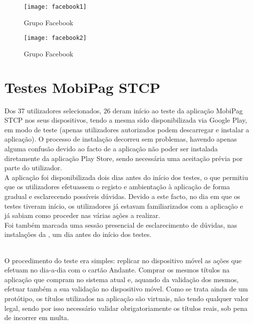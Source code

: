 \begin{figure}[t]
  \begin{center}
    \leavevmode
    \texttt{[image: facebook1]}
    \caption{Grupo Facebook}
    \label{facebook1}
  \end{center}
\end{figure}

\begin{figure}[t]
  \begin{center}
    \leavevmode
    \texttt{[image: facebook2]}
    \caption{Grupo Facebook}
    \label{facebook2}
  \end{center}
\end{figure}

\section{Testes MobiPag STCP}

Dos 37 utilizadores selecionados, 26 deram início ao teste da aplicação MobiPag STCP nos seus dispositivos, tendo a mesma sido disponibilizada via Google Play, em modo de teste (apenas utilizadores autorizados podem descarregar e instalar a aplicação). O processo de instalação decorreu sem problemas, havendo apenas alguma confusão devido ao facto de a aplicação não poder ser instalada diretamente da aplicação Play Store, sendo necessária uma aceitação prévia por parte do utilizador.
\\A aplicação foi disponibilizada dois dias antes do início dos testes, o que permitiu que os utilizadores efetuassem o registo e ambientação à aplicação de forma gradual e esclarecendo possíveis dúvidas. Devido a este facto, no dia em que os testes tiveram início, os utilizadores já estavam familiarizados com a aplicação e já sabiam como proceder nas várias ações a realizar.
\\Foi também marcada uma sessão presencial de esclarecimento de dúvidas, nas instalações da \Feup, um dia antes do início dos testes.

~\\O procedimento do teste era simples: replicar no dispositivo móvel as ações que efetuam no dia-a-dia com o cartão Andante. Comprar os mesmos títulos na aplicação que compram no sistema atual e, aquando da validação dos mesmos, efetuar também a sua validação no dispositivo móvel. Como se trata ainda de um protótipo, os títulos utilizados na aplicação são virtuais, não tendo qualquer valor legal, sendo por isso necessário validar obrigatoriamente os títulos reais, sob pena de incorrer em multa.

